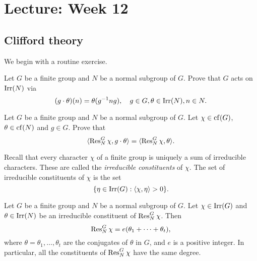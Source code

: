 \section{Lecture: Week 12}

\subsection{Clifford theory}

We begin with a routine exercise. 


\begin{exercise}
\label{xca:conjugate_chars1}
Let $G$ be a finite group and $N$ be a normal subgroup
of $G$. Prove that $G$ acts on $\operatorname{Irr}(N)$ via 
\[
(g\cdot\theta)(n)=\theta(g^{-1}ng),\quad 
g\in G,\theta\in\operatorname{Irr}(N),n\in N.
\]
\end{exercise}

\begin{exercise}
\label{xca:conjugate_chars2}
Let $G$ be a finite group and $N$ be a normal subgroup of $G$. 
Let $\chi\in\operatorname{cf}(G)$, $\theta\in\operatorname{cf}(N)$ and $g\in G$. Prove that
\[
\langle\operatorname{Res}_N^G\chi,g\cdot\theta\rangle=\langle\operatorname{Res}_N^G\chi,\theta\rangle.
\]
\end{exercise}

Recall that every character $\chi$ of a finite group is uniquely 
a sum of irreducible characters. These are called
the \emph{irreducible constituents} of $\chi$. The set 
of irreducible constituents of $\chi$ is the set  
\[
\{\eta\in\operatorname{Irr}(G):\langle\chi,\eta\rangle>0\}.
\]

\begin{theorem}[Clifford]
\label{thm:Clifford}
    Let $G$ be a finite group and $N$ be a normal
    subgroup of $G$. Let $\chi\in\operatorname{Irr}(G)$ and $\theta\in\operatorname{Irr}(N)$ be 
    an irreducible constituent of $\operatorname{Res}_N^G\chi$. 
    Then 
    \[
    \operatorname{Res}_N^G\chi = e(\theta_1+\cdots+\theta_t),
    \]
    where $\theta=\theta_1,\dots,\theta_t$ are the conjugates 
    of $\theta$ in $G$, 
    and $e$ is a positive integer. In particular, all the constituents of $\operatorname{Res}_N^G\chi$ have the same degree. 
\end{theorem}

